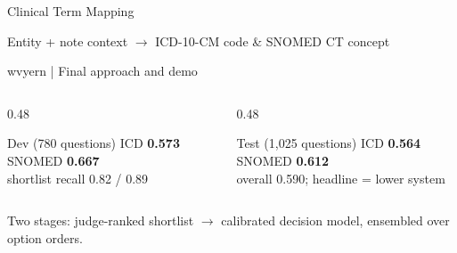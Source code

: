 \documentclass[aspectratio=169,10pt]{beamer}
\newcommand{\hl}[1]{\textcolor{accent}{\textbf{#1}}}
\begin{document}
\begin{frame}[plain]
\vspace{10mm}
{Clinical Term Mapping\par}
\vspace{2mm}
{\large Entity + note context $\rightarrow$ ICD-10-CM code \& SNOMED CT concept\par}
\vspace{7mm}
{\color{muted}wvyern \;|\; Final approach and demo\par}
\vspace{6mm}
\begin{columns}[T]
\begin{column}{0.48\textwidth}
\begin{block}{Dev (780 questions)}
ICD \hl{0.573} \quad SNOMED \hl{0.667}\\[1pt]
{\small shortlist recall 0.82 / 0.89}
\end{block}
\end{column}
\begin{column}{0.48\textwidth}
\begin{block}{Test (1{,}025 questions)}
ICD \hl{0.564} \quad SNOMED \hl{0.612}\\[1pt]
{\small overall 0.590; headline = lower system}
\end{block}
\end{column}
\end{columns}
\vspace{4mm}
{\small\color{muted}Two stages: judge-ranked shortlist $\rightarrow$ calibrated decision model, ensembled over option orders.}
\end{frame}
\end{document}
